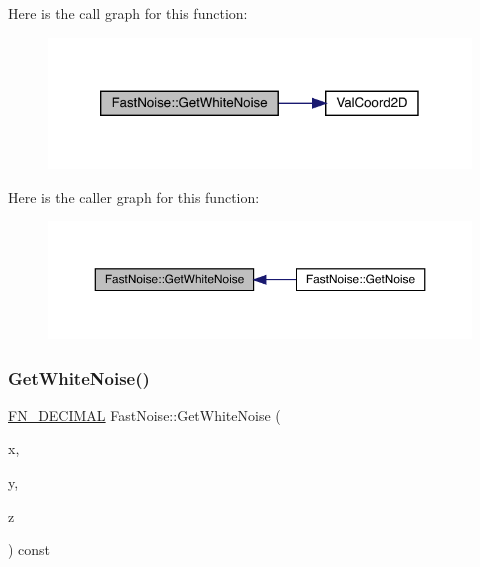 Here is the call graph for this function\+:
\nopagebreak
\begin{figure}[H]
\begin{center}
\leavevmode
\includegraphics[width=320pt]{d1/dd8/class_fast_noise_aaf5a3c39b9e95d064690711852fb7fbf_cgraph}
\end{center}
\end{figure}
Here is the caller graph for this function\+:
\nopagebreak
\begin{figure}[H]
\begin{center}
\leavevmode
\includegraphics[width=350pt]{d1/dd8/class_fast_noise_aaf5a3c39b9e95d064690711852fb7fbf_icgraph}
\end{center}
\end{figure}
\mbox{\label{class_fast_noise_a661febd01ba99e06b9de5fab9bd13fb0}} 
\subsubsection{\texorpdfstring{Get\+White\+Noise()}{GetWhiteNoise()}\hspace{0.1cm}{\footnotesize\ttfamily [2/3]}}
{\footnotesize\ttfamily \mbox{\hyperlink{_fast_noise_8h_a75a9ef6d2541c4921815b885bfd449c3}{F\+N\+\_\+\+D\+E\+C\+I\+M\+AL}} Fast\+Noise\+::\+Get\+White\+Noise (\begin{DoxyParamCaption}\item[{\mbox{\hyperlink{_fast_noise_8h_a75a9ef6d2541c4921815b885bfd449c3}{F\+N\+\_\+\+D\+E\+C\+I\+M\+AL}}}]{x,  }\item[{\mbox{\hyperlink{_fast_noise_8h_a75a9ef6d2541c4921815b885bfd449c3}{F\+N\+\_\+\+D\+E\+C\+I\+M\+AL}}}]{y,  }\item[{\mbox{\hyperlink{_fast_noise_8h_a75a9ef6d2541c4921815b885bfd449c3}{F\+N\+\_\+\+D\+E\+C\+I\+M\+AL}}}]{z }\end{DoxyParamCaption}) const}

